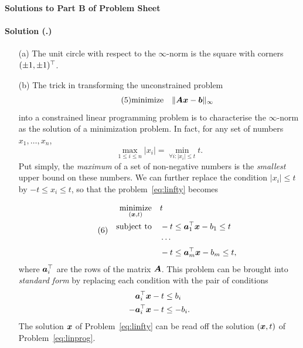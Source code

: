 \documentclass{article}
\newcounter{problemSheetNumber}
\newcounter{problems}
\renewcommand{\solution}[1]{\paragraph{Solution (\theproblemSheetNumber.\theproblems)}\addtocounter{problems}{1}\label{#1}}
\begin{document}
 
\begin{center}
{\Large {\bf Solutions to Part B of Problem Sheet \theproblemSheetNumber}}
\end{center}

\solution{pr:3} 
\begin{itemize}
\item[(a)] The unit circle with respect to the $\infty$-norm is the square with corners $(\pm 1,\pm 1)^{\top}$.
\item[(b)] The trick in transforming the unconstrained problem
\begin{equation}\label{eq:linfty}\tag{5}
 \text{minimize}\quad \Vert {\bm{A}\bm{x}-\bm{b}}\Vert_{\infty}
\end{equation}
into a constrained linear programming problem is to characterise the $\infty$-norm as the solution of a minimization problem. In fact, for any set of numbers $x_1,\dots,x_n$,
\begin{equation*}
 \max_{1\leq i\leq n} |x_i| = \min_{\forall i\colon |x_i|\leq t} t.
\end{equation*}
Put simply, the {\em maximum} of a set of non-negative numbers is the {\em smallest} upper bound on these numbers. We can further replace the condition $|x_i|\leq t$ by $-t\leq x_i\leq t$, so that the problem~\eqref{eq:linfty} becomes

\begin{align}\label{eq:linprog}\tag{6}
\begin{split}
\mathop{\text{minimize}}_{(\bm{x},t)} \quad & t \\
\quad\text{subject to}\quad & -t \leq \bm{a}_1^{\top} \bm{x} - b_1 \leq t\\
& \cdots\\
& -t \leq \bm{a}_m^{\top}\bm{x} - b_m \leq t,
\end{split}
\end{align}
where $\bm{a}_i^{\top}$ are the rows of the matrix $\bm{A}$. This problem can be brought into {\em standard form} by replacing each condition with the pair of conditions
\begin{align*}
 \bm{a}_i^{\top}\bm{x}-t&\leq b_i\\
 -\bm{a}_i^{\top}\bm{x}-t& \leq -b_i.
\end{align*}
The solution $\bm{x}$ of Problem~\eqref{eq:linfty} can be read off the solution $(\bm{x},t)$ of Problem~\eqref{eq:linprog}.
\end{itemize}
\end{document}
